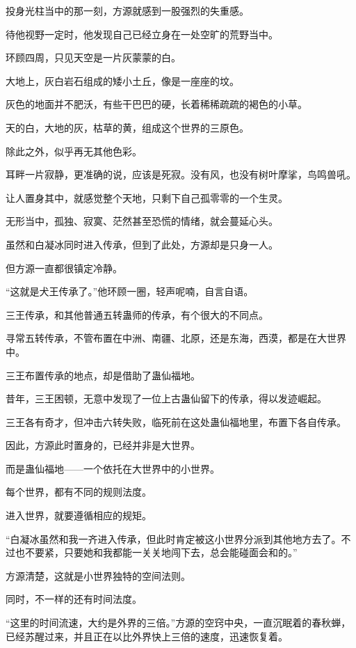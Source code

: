 
\begin{this_body}

投身光柱当中的那一刻，方源就感到一股强烈的失重感。

待他视野一定时，他发现自己已经立身在一处空旷的荒野当中。

环顾四周，只见天空是一片灰蒙蒙的白。

大地上，灰白岩石组成的矮小土丘，像是一座座的坟。

灰色的地面并不肥沃，有些干巴巴的硬，长着稀稀疏疏的褐色的小草。

天的白，大地的灰，枯草的黄，组成这个世界的三原色。

除此之外，似乎再无其他色彩。

耳畔一片寂静，更准确的说，应该是死寂。没有风，也没有树叶摩挲，鸟鸣兽吼。

让人置身其中，就感觉整个天地，只剩下自己孤零零的一个生灵。

无形当中，孤独、寂寞、茫然甚至恐慌的情绪，就会蔓延心头。

虽然和白凝冰同时进入传承，但到了此处，方源却是只身一人。

但方源一直都很镇定冷静。

“这就是犬王传承了。”他环顾一圈，轻声呢喃，自言自语。

三王传承，和其他普通五转蛊师的传承，有个很大的不同点。

寻常五转传承，不管布置在中洲、南疆、北原，还是东海，西漠，都是在大世界中。

三王布置传承的地点，却是借助了蛊仙福地。

昔年，三王困顿，无意中发现了一位上古蛊仙留下的传承，得以发迹崛起。

三王各有奇才，但冲击六转失败，临死前在这处蛊仙福地里，布置下各自传承。

因此，方源此时置身的，已经并非是大世界。

而是蛊仙福地——一个依托在大世界中的小世界。

每个世界，都有不同的规则法度。

进入世界，就要遵循相应的规矩。

“白凝冰虽然和我一齐进入传承，但此时肯定被这小世界分派到其他地方去了。不过也不要紧，只要她和我都能一关关地闯下去，总会能碰面会和的。”

方源清楚，这就是小世界独特的空间法则。

同时，不一样的还有时间法度。

“这里的时间流速，大约是外界的三倍。”方源的空窍中央，一直沉眠着的春秋蝉，已经苏醒过来，并且正在以比外界快上三倍的速度，迅速恢复着。


\end{this_body}

